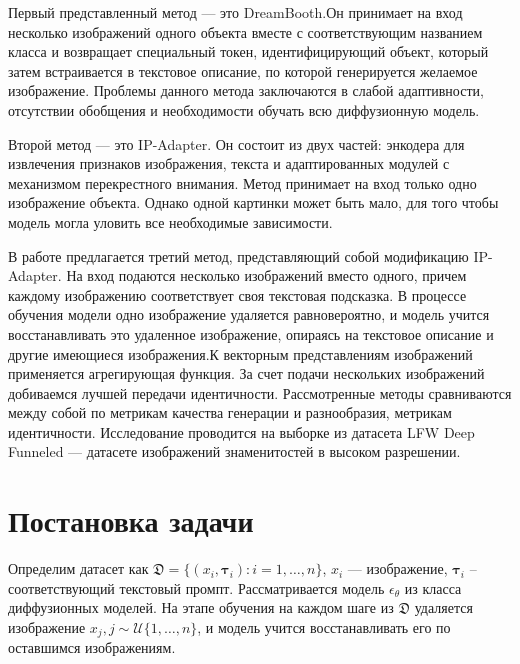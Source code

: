 \documentclass{article}
\begin{document}
Первый представленный метод --- это DreamBooth\cite{3}.Он принимает на вход несколько изображений одного объекта вместе с соответствующим названием класса и возвращает специальный токен, идентифицирующий объект, который затем встраивается в текстовое описание, по которой генерируется желаемое изображение. Проблемы данного метода заключаются в слабой адаптивности, отсутствии обобщения и необходимости обучать всю диффузионную модель. 

Второй метод --- это IP-Adapter\cite{1}. Он состоит из двух частей: энкодера для извлечения признаков изображения, текста и адаптированных модулей с механизмом перекрестного внимания. Метод принимает на вход только одно изображение объекта. Однако одной картинки может быть мало, для того чтобы модель могла уловить все необходимые зависимости. 

В работе предлагается третий метод, представляющий собой модификацию IP-Adapter. На вход подаются несколько изображений вместо одного, причем каждому изображению соответствует своя текстовая подсказка. В процессе обучения модели одно изображение удаляется равновероятно, и модель учится восстанавливать это удаленное изображение, опираясь на текстовое описание и другие имеющиеся изображения.К векторным представлениям изображений применяется агрегирующая функция. За счет подачи нескольких изображений добиваемся лучшей передачи идентичности. 
Рассмотренные методы сравниваются между собой по метрикам качества генерации и разнообразия, метрикам идентичности.
Исследование проводится на выборке из датасета LFW Deep Funneled\cite{5} --- датасете изображений знаменитостей в высоком разрешении. 

\section{Постановка задачи}

Определим датасет как $ \mathfrak{D}=\{ ({x}_{i}, \mathbf{\tau}_{i}): i = 1, \dots, n\}$, ${x}_{i}$ --- изображение, $\mathbf{\tau}_{i}$ -- соответствующий текстовый промпт. Рассматривается модель $\epsilon_{\theta}$ из класса диффузионных моделей. На этапе обучения на каждом шаге из $\mathfrak{D}$ удаляется изображение ${x}_{j}, j \sim \mathcal{U}\{1, \dots, n\}$, и модель учится восстанавливать его по оставшимся изображениям.
\end{document}
